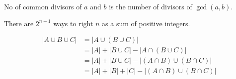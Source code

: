\documentclass[12pt,a4paper]{article}
\begin{document}
No of common divisors of \(a\) and \(b\) is the number of divisors of \(\gcd(a,b)\).

There are \(2^{n-1}\) ways to right \(n\) as a sum of positive integers.

\[\begin{aligned}
	|A\cup B\cup C|&=|A\cup(B\cup C)|\\
		       &=|A|+|B\cup C|-|A\cap(B\cup C)|\\
		       &=|A|+|B\cup C|-|(A\cap B)\cup(B\cap C)|\\
		       &=|A|+|B|+|C|-|(A\cap B)\cup(B\cap C)|\\
\end{aligned}\]
\end{document}
